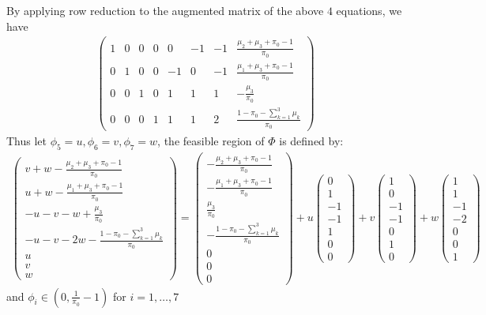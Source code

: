 \documentclass[11 pt, a4paper]{article}  %
\begin{document}
By applying row reduction to the augmented matrix of the above $4$ equations, we have 
\begin{align*}
\begin{pmatrix}
1 & 0 & 0 & 0  & 0 & -1 & -1 & \frac{\mu_2+\mu_3+\pi_0-1}{\pi_0}\\ 
0 & 1 & 0 & 0 & -1 & 0 & -1 & \frac{\mu_1+\mu_3+\pi_0-1}{\pi_0} \\ 
0 & 0 & 1 & 0 & 1 & 1 & 1 & - \frac{\mu_3}{\pi_0}\\ 
0 & 0 & 0 & 1 & 1 & 1 & 2 &  \frac{1 - \pi_0 - \sum_{k=1}^3 \mu_k}{\pi_0}
\end{pmatrix}
\end{align*}
Thus let $\phi_5 = u, \phi_6 = v, \phi_7 = w $, the feasible region of $\Phi$ is defined by:
\begin{align*}
\begin{pmatrix}
v + w - \frac{\mu_2+\mu_3+\pi_0-1}{\pi_0}\\ 
u + w - \frac{\mu_1+\mu_3+\pi_0-1}{\pi_0} \\ 
- u -v -w + \frac{\mu_3}{\pi_0}\\ 
-u -v -2w  - \frac{1 - \pi_0 - \sum_{k=1}^3 \mu_k}{\pi_0}\\
u\\
v\\
w
\end{pmatrix}  = 
\begin{pmatrix}
 - \frac{\mu_2+\mu_3+\pi_0-1}{\pi_0}\\ 
 - \frac{\mu_1+\mu_3+\pi_0-1}{\pi_0} \\ 
  \frac{\mu_3}{\pi_0}\\ 
  - \frac{1 - \pi_0 - \sum_{k=1}^3 \mu_k}{\pi_0}\\
0\\
0\\
0
\end{pmatrix}  + u
\begin{pmatrix}
0\\ 
1 \\ 
-1\\ 
-1\\
1\\
0\\
0
\end{pmatrix} + v
\begin{pmatrix}
1\\ 
0 \\ 
-1\\ 
-1\\
0\\
1\\
0
\end{pmatrix}  + w
\begin{pmatrix}
1\\ 
1 \\ 
-1\\ 
-2\\
0\\
0\\
1
\end{pmatrix}  
\end{align*}
and $\phi_i \in  (0, \frac{1}{\pi_0}-1)$ for $i = 1, \ldots, 7$\\
\end{document}
